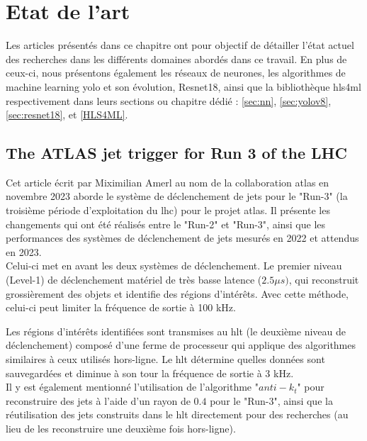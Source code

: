
\chapter{Etat de l'art} %

\label{StateOfTheArt} %


Les articles présentés dans ce chapitre ont pour objectif de détailler l'état actuel des recherches dans les différents domaines abordés dans ce travail. En plus de ceux-ci, nous présentons également les réseaux de neurones, les algorithmes de machine learning \acrshort{yolo} et son évolution, Resnet18, ainsi que la bibliothèque \acrshort{hls4ml} respectivement dans leurs sections ou chapitre dédié : \ref{sec:nn}, \ref{sec:yolov8}, \ref{sec:resnet18}, et \ref{HLS4ML}.

\section{The ATLAS jet trigger for Run 3 of the LHC \cite{amerl_atlas_2023}}
Cet article écrit par Miximilian Amerl au nom de la collaboration \acrshort{atlas} en novembre 2023 aborde le système de déclenchement de jets pour le "Run-3" (la troisième période d'exploitation du \acrshort{lhc}) pour le projet \acrshort{atlas}. Il présente les changements qui ont été réalisés entre le "Run-2" et "Run-3", ainsi que les performances des systèmes de déclenchement de jets mesurés en 2022 et attendus en 2023.\\

Celui-ci met en avant les deux systèmes de déclenchement. Le premier niveau (Level-1) de déclenchement matériel de très basse latence ($2.5\mu s)$, qui reconstruit grossièrement des objets et identifie des régions d'intérêts. Avec cette méthode, celui-ci peut limiter la fréquence de sortie à 100 kHz.

Les régions d'intérêts identifiées sont transmises au \acrfull{hlt} (le deuxième niveau de déclenchement) composé d'une ferme de processeur qui applique des algorithmes similaires à ceux utilisés hors-ligne. Le \acrshort{hlt} détermine quelles données sont sauvegardées et diminue à son tour la fréquence de sortie à 3 kHz.\\

Il y est également mentionné l'utilisation de l'algorithme "$anti-k_t$" pour reconstruire des jets à l'aide d'un rayon de $0.4$ pour le "Run-3", ainsi que la réutilisation des jets construits dans le \acrshort{hlt} directement pour des recherches (au lieu de les reconstruire une deuxième fois hors-ligne).\\

